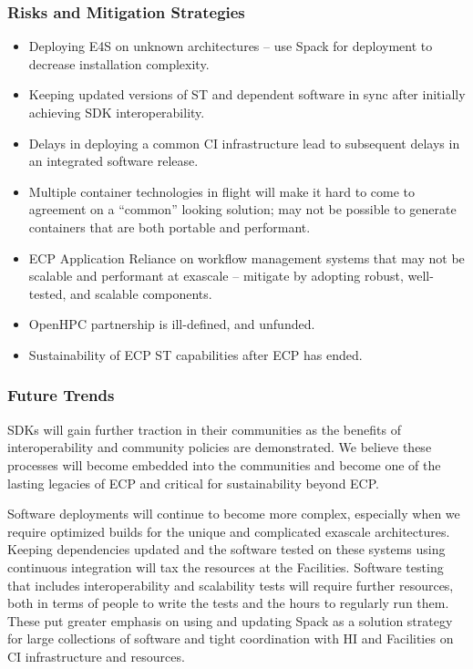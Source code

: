 \subsubsection{Risks and Mitigation Strategies}
\begin{itemize}
	\item Deploying E4S on unknown architectures -- use Spack for deployment to decrease installation complexity.
        \item Keeping updated versions of ST and dependent software in sync after initially achieving SDK interoperability.
	\item Delays in deploying a common CI infrastructure lead to subsequent delays in an integrated software release.
	\item Multiple container technologies in flight will make it hard to come to agreement on a ``common'' looking solution; may not be possible to generate containers that are both portable and performant.
	\item ECP Application Reliance on workflow management systems that may not be scalable and performant at exascale -- mitigate by adopting robust, well-tested, and scalable components.
	\item OpenHPC partnership is ill-defined, and unfunded.
	\item Sustainability of ECP ST capabilities after ECP has ended.
\end{itemize}

\subsubsection{Future Trends}

SDKs will gain further traction in their communities as the benefits of 
interoperability and community policies are demonstrated.  We believe these processes will
become embedded into the communities and become one of the lasting legacies of ECP and
critical for sustainability beyond ECP.

Software deployments will continue to become more complex, especially when we require optimized 
builds for the unique and complicated exascale architectures.  Keeping dependencies updated and 
the software tested on these systems using continuous integration will tax the resources at 
the Facilities.  Software testing that includes interoperability and scalability tests will 
require further resources, both in terms of people to write the tests and the hours to
regularly run them.  These put greater emphasis on using and updating Spack as a
solution strategy for large collections of software and tight coordination with
HI and Facilities on CI infrastructure and resources.

